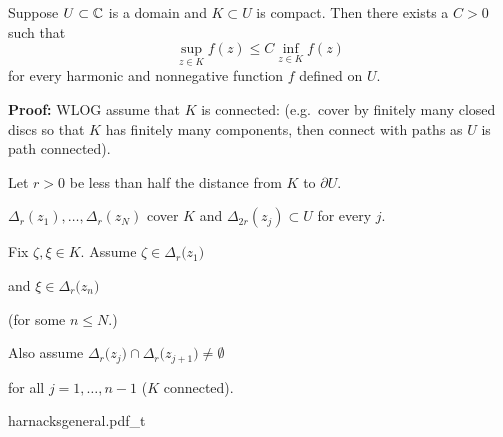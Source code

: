 \documentclass[10pt,aspectratio=169]{beamer}
\begin{document}
\begin{frame}
\begin{corollary}
Suppose $U \subset {\mathbb{C}}$ is a domain and $K \subset U$ is compact.
Then there exists a $C > 0$ such that
\begin{equation*}
\sup_{z \in K} f(z) \leq C \inf_{z\in K} f(z)
\end{equation*}
for every harmonic and nonnegative function $f$ defined on $U$.
\end{corollary}

\pause

\textbf{Proof:}
WLOG assume that $K$ is connected: \pause
(e.g.\ cover by finitely many closed discs so that $K$ has finitely many
components, then connect with paths as
$U$ is path connected).

\medskip
\pause

Let 
$r> 0$ be less than half the distance from $K$ to $\partial U$.

\pause
$\Delta_{r}(z_1),\ldots,\Delta_{r}(z_N)$ cover $K$
and
$\Delta_{2r}(z_j) \subset U$ for every $j$.

\pause
Fix $\zeta,\xi \in K$.
\pause
Assume
$\zeta \in \Delta_{r}\bigl(z_{1}\bigr)$

and
$\xi \in \Delta_{r}\bigl(z_{n}\bigr)$

(for some $n \leq N$.)
\pause

Also assume
$\Delta_{r}\bigl(z_{j}\bigr) \cap \Delta_{r}\bigl(z_{j+1}\bigr)
\not=\emptyset$

for all $j=1,\ldots,n-1$ ($K$ connected).
\pause

\vspace*{-1in}
\hfill
{harnacksgeneral.pdf_t}

\end{frame}
\end{document}
